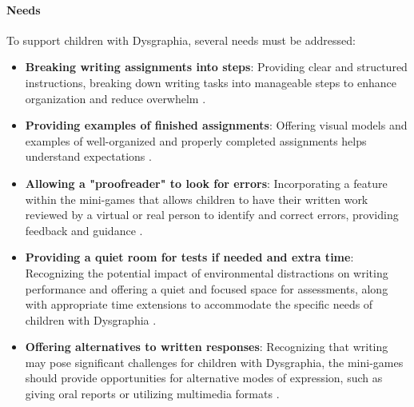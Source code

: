 \paragraph{Needs}
To support children with Dysgraphia, several needs must be addressed:
\begin{itemize}
    \item \textbf{Breaking writing assignments into steps}: Providing clear and structured instructions, breaking down writing tasks into manageable steps to enhance organization and reduce overwhelm \cite{understood_accommodations}.
    \item \textbf{Providing examples of finished assignments}: Offering visual models and examples of well-organized and properly completed assignments helps understand expectations \cite{edutopia_dysgraphia}.
    \item \textbf{Allowing a "proofreader" to look for errors}: Incorporating a feature within the mini-games that allows children to have their written work reviewed by a virtual or real person to identify and correct errors, providing feedback and guidance \cite{pmc_dysgraphia}.
    \item \textbf{Providing a quiet room for tests if needed and extra time}: Recognizing the potential impact of environmental distractions on writing performance and offering a quiet and focused space for assessments, along with appropriate time extensions to accommodate the specific needs of children with Dysgraphia \cite{understood_accommodations}.
    \item \textbf{Offering alternatives to written responses}: Recognizing that writing may pose significant challenges for children with Dysgraphia, the mini-games should provide opportunities for alternative modes of expression, such as giving oral reports or utilizing multimedia formats \cite{cleveland_dysgraphia}.
\end{itemize}